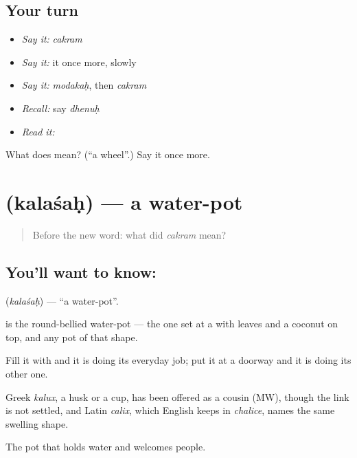 \subsection*{Your turn}
\begin{itemize}
\raggedright
  \item \emph{Say it:} \emph{cakram}
  \item \emph{Say it:} it once more, slowly
  \item \emph{Say it:} \emph{modakaḥ}, then \emph{cakram}
  \item \emph{Recall:} say \emph{dhenuḥ}
  \item \emph{Read it:} \textbf{}
\end{itemize}

\begin{tcolorbox}[breakable,colback=teal!4,colframe=teal!35!black,title={Before you move on}]
What does  mean? (\textquotedblleft{}a wheel\textquotedblright{}.) Say it once more.
\end{tcolorbox}
\section[\texorpdfstring{\sk{कलशः} (kalaśaḥ)}{कलशः (kalaśaḥ)}]{ (kalaśaḥ) — a water-pot}

\label{lesson:SA-C41-pot}



\begin{quote}
Before the new word: what did \emph{cakram} mean?
\end{quote}

\subsection*{You'll want to know: }
\textbf{} (\emph{kalaśaḥ}) — \textquotedblleft{}a water-pot\textquotedblright{}.

\textbf{} is the round-bellied water-pot — the one set at a  with leaves and a coconut on top, and any pot of that shape.

Fill it with  and it is doing its everyday job; put it at a doorway and it is doing its other one.

Greek \emph{kalux}, a husk or a cup, has been offered as a cousin (MW), though the link is not settled, and Latin \emph{calix}, which English keeps in \emph{chalice}, names the same swelling shape.

\begin{grammarlens}[title={What you've built}]
The pot that holds water and welcomes people.
\end{grammarlens}

